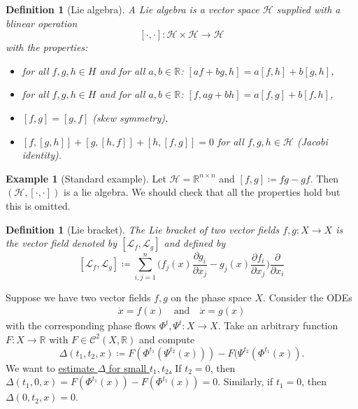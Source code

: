 \documentclass[hidelinks,a4paper, 11pt]{article}
\theoremstyle{plain}
\theoremstyle{break}
\theoremstyle{plain}
\newtheorem{definition}[theorem]{Definition}
\theoremstyle{definition}
\newtheorem*{example}{Example}
\begin{document}
\begin{definition}[Lie algebra]
	A Lie algebra is a vector space $\mathcal H$ supplied with a blinear operation $$[\cdot,\cdot]: \mathcal H \times \mathcal H \to \mathcal H$$ with the properties:
	\begin{itemize}
		\item for all $f,g,h \in H$ and for all $a,b \in \mathbb R$: $[af+bg,h] = a[f,h] + b[g,h]$,
		\item for all $f,g,h \in H$ and for all $a,b \in \mathbb R$: $[f,ag+bh] = a[f,g] + b[f,h]$,
		\item $[f,g] = [g,f]$ (skew symmetry),
		\item $[f,[g,h]] + [g,[h,f]] + [h,[f,g]] = 0$ for all $f,g,h \in \mathcal H$ (Jacobi identity).
	\end{itemize}
\end{definition}

\begin{example}[Standard example]
	Let $\mathcal H = \mathbb R^{n \times n}$ and $[f,g] \coloneqq fg -gf$. Then $(\mathcal H, [\cdot, \cdot])$ is a lie algebra. We should check that all the properties hold but this is omitted.
\end{example}

\begin{definition}[Lie bracket]
	The \emph{Lie bracket} of two vector fields $f,g: X \to X$ is the vector field denoted by $[\mathcal L_f,\mathcal L_g]$ and defined by
	\[
		[\mathcal L_f,\mathcal L_g] \coloneqq \sum^n_{i,j=1}\Big(f_j(x)\frac{\partial g_i}{\partial x_j} - g_j(x)\frac{\partial f_i}{\partial x_j}\Big)\frac{\partial}{\partial x_i}
	\]
\end{definition}

Suppose we have two vector fields $f,g$ on the phase space $X$. Consider the ODEs
\begin{align*}
	\dot x = f(x) \quad \text{and} \quad \dot x = g(x)
\end{align*}
with the corresponding phase flows $\Phi^t, \Psi^t: X \to X$. Take an arbitrary function $F: X \to \mathbb R$ with $F \in \mathcal C^2(X, \mathbb R)$ and compute 
\[
	\Delta(t_1,t_2,x) \coloneqq F(\Phi^{t_1}(\Psi^{t_2}(x))) - F(\Psi^{t_2}(\Phi^{t_1}(x)).
\]
We want to \underline{estimate $\Delta$ for small $t_1,t_2$.} If $t_2=0$, then $\Delta(t_1,0,x) = F(\Phi^{t_1}(x)) - F(\Phi^{t_1}(x)) = 0$. Similarly, if $t_1 = 0$, then $\Delta(0,t_2,x) = 0$.
\end{document}
